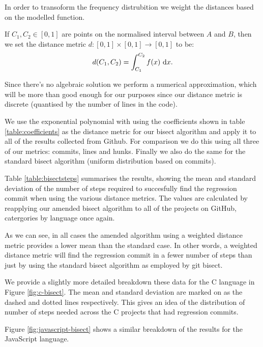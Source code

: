 \documentclass[10pt,journal,compsoc]{IEEEtran}
\begin{document}
In order to transoform the frequency distrubition we weight the distances based on the modelled function.

If $C_1, C_2 \in [0, 1]$ are points on the normalised interval between $A$ and $B$, then we set the distance metric $d : [0, 1] \times [ 0, 1 ] \to [ 0, 1 ]$ to be:
$$
d(C_1, C_2) = \int_{C_1}^{C_2} f(x) \ {\rm d}x .
$$

Since there's no algebraic solution we perform a numerical approximation, which will be more than good enough for our purposes since our distance metric is discrete (quantised by the number of lines in the code).

We use the exponential polynomial with using the coefficients shown in table \ref{table:coefficients} as the distance metric for our bisect algorithm and apply it to all of the results collected from Github. For comparison we do this using all three of our metrics: commits, lines and hunks. Finally we also do the same for the standard bisect algorithm (uniform distribution based on commits).

Table \ref{table:bisectsteps} summarises the results, showing the mean and standard deviation of the number of steps required to succesfully find the regression commit when using the various distance metrics. The values are calculated by reapplying our amended bisect algorithm to all of the projects on GitHub, catergories by language once again.

As we can see, in all cases the amended algorithm using a weighted distance metric provides a lower mean than the standard case. In other words, a weighted distance metric will find the regression commit in a fewer number of steps than just by using the standard bisect algorithm as employed by {\code git bisect}.

We provide a slightly more detailed breakdown these data for the C language in Figure \ref{fig:c-bisect}. The mean and standard deviation are marked on as the dashed and dotted lines respectively. This gives an idea of the distribution of number of steps needed across the C projects that had regression commits.

Figure \ref{fig:javascript-bisect} shows a similar breakdown of the results for the JavaScript language.
\end{document}
